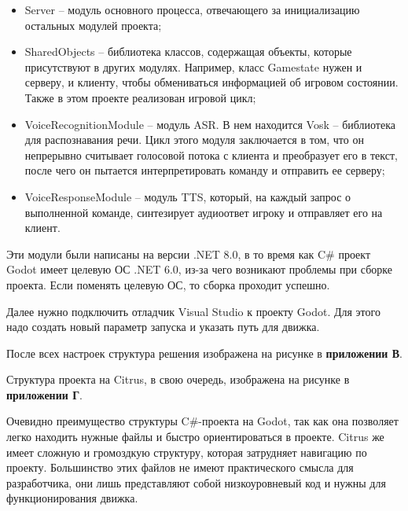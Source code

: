         \begin{itemize}
            \item Server -- модуль основного процесса, отвечающего за инициализацию остальных модулей проекта;
            \item SharedObjects -- библиотека классов, содержащая объекты, которые присутствуют в других модулях. Например, класс Gamestate нужен и серверу, и клиенту, чтобы обмениваться информацией об игровом состоянии. Также в этом проекте реализован игровой цикл;
            \item VoiceRecognitionModule -- модуль ASR. В нем находится Vosk -- библиотека для распознавания речи. Цикл этого модуля заключается в том, что он непрерывно считывает голосовой потока с клиента и преобразует его в текст, после чего он пытается интерпретировать команду и отправить ее серверу;
            \item VoiceResponseModule -- модуль TTS, который, на каждый запрос о выполненной команде, синтезирует аудиоответ игроку и отправляет его на клиент.
        \end{itemize}

        Эти модули были написаны на версии .NET 8.0, в то время как C\# проект Godot имеет целевую ОС .NET 6.0, из-за чего возникают проблемы при сборке проекта. Если поменять целевую ОС, то сборка
        проходит успешно.

        Далее нужно подключить отладчик Visual Studio к проекту Godot. Для этого надо создать новый параметр запуска и указать путь для движка.
        
        После всех настроек структура решения изображена на рисунке в \textbf{приложении В}.

        Структура проекта на Citrus, в свою очередь, изображена на рисунке в \textbf{приложении Г}.


        Очевидно преимущество структуры C\#-проекта на Godot, так как она позволяет легко находить нужные файлы и быстро ориентироваться в проекте. Citrus же имеет сложную и громоздкую структуру, 
        которая затрудняет навигацию по проекту. Большинство этих файлов не имеют практического смысла для разработчика, они лишь представляют собой низкоуровневый код и нужны для функционирования 
        движка. 

